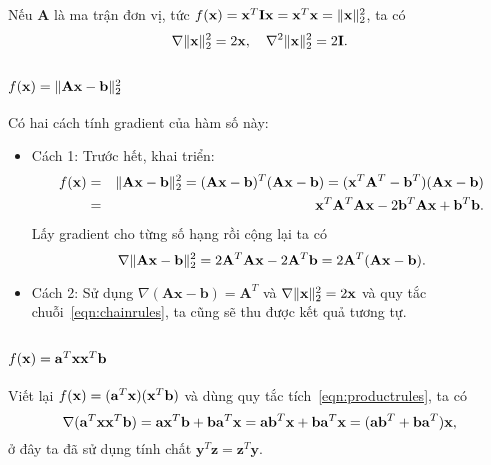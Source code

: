 Nếu $\mathbf{A}$ là ma trận đơn vị, tức $f(\mathbf{x}) = \mathbf{x}^T\mathbf{Ix} = \mathbf{x}^T\mathbf{x} = \|\mathbf{x}\|_2^2$, ta có
\begin{equation}
\nabla \|\mathbf{x}\|_2^2 = 2\mathbf{x},~~~
\nabla^2 \|\mathbf{x}\|_2^2 = 2\mathbf{I}.
\end{equation}


\subsection{$f(\mathbf{x}) = \|\mathbf{Ax} - \mathbf{b}\|_2^2 $}
\label{sec:gr_squarenorm2}
Có hai cách tính gradient của hàm số này:
\begin{itemize}
\item {Cách 1:} Trước hết, khai triển:
\begin{eqnarray}
\nonumber
f(\mathbf{x}) &=& \|\mathbf{Ax} - \mathbf{b}\|_2^2 = (\mathbf{Ax} - \mathbf{b})^T(\mathbf{Ax} - \mathbf{b}) = (\mathbf{x}^T\mathbf{A}^T - \mathbf{b}^T) (\mathbf{Ax} - \mathbf{b}) \\\ \nonumber
&=& \mathbf{x}^T\mathbf{A}^T\mathbf{Ax} - 2 \mathbf{b}^T\mathbf{Ax} + \mathbf{b}^T\mathbf{b}.
\end{eqnarray}
Lấy gradient cho từng số hạng rồi cộng lại ta có
\begin{equation*}
\nabla \|\mathbf{Ax} - \mathbf{b}\|_2^2 = 2\mathbf{A}^T\mathbf{A}\mathbf{x} - 2\mathbf{A}^T\mathbf{b} = 2\mathbf{A}^T(\mathbf{Ax} - \mathbf{b}).
\end{equation*}

\item {Cách 2:} Sử dụng $\nabla (\mathbf{Ax} - \mathbf{b}) =
\mathbf{A}^T$ và $\nabla \|\mathbf{x}\|_2^2 = 2\mathbf{x}$ và quy tắc chuỗi~\eqref{eqn:chainrules}, ta cũng sẽ thu được kết quả tương tự.
\end{itemize}

\subsection{$f(\mathbf{x}) = \mathbf{a}^T\mathbf{x}\mathbf{x}^T\mathbf{b}$}
Viết lại $f(\mathbf{x}) = (\mathbf{a}^T\mathbf{x})(\mathbf{x}^T\mathbf{b})$ và dùng
quy tắc tích~\eqref{eqn:productrules}, ta có
\begin{equation*}
\nabla (\mathbf{a}^T\mathbf{x}\mathbf{x}^T\mathbf{b}) = \mathbf{a} \mathbf{x}^T\mathbf{b} +
\mathbf{b}\mathbf{a}^T\mathbf{x} = \mathbf{ab}^T\mathbf{x} + \mathbf{b}\mathbf{a}^T\mathbf{x}=
(\mathbf{ab}^T + \mathbf{ba}^T)\mathbf{x},
\end{equation*}
ở đây ta đã sử dụng tính chất $\mathbf{y}^T\mathbf{z} = \mathbf{z}^T\mathbf{y}$.


